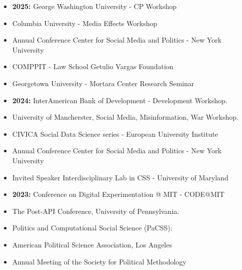 \documentclass[letterpaper, 11pt]{article}
\begin{document}
    \begin{itemize}[leftmargin=0cm, noitemsep]
     \item \textbf{2025:} \hspace{.02cm} George Washington University - CP Workshop
    \item \hspace{1.25cm} Columbia University - Media Effects Workshop
    \item \hspace{1.25cm} Annual Conference Center for Social Media and Politics - New York University
    \item \hspace{1.25cm} COMPPIT - Law School Getulio Vargas Foundation
    \item \hspace{1.25cm} Georgetown University - Mortara Center Research Seminar
    \item \textbf{2024:} \hspace{.02cm} InterAmerican Bank of Development - Development Workshop.
    \item \hspace{1.25cm} University of Mancherster, Social Media, Misinformation, War Workshop.
    \item \hspace{1.25cm} CIVICA Social Data Science series - European University Institute
     \item \hspace{1.25cm} Annual Conference Center for Social Media and Politics - New York University
      \item \hspace{1.25cm} Invited Speaker Interdisciplinary Lab in CSS - University of Maryland
    \item \textbf{2023:} \hspace{.02cm} Conference on Digital Experimentation @ MIT - CODE@MIT
    \item \hspace{1.25cm} The Post-API Conference, University of Pennsylvania.
    \item \hspace{1.25cm} Politics and Computational Social Science (PaCSS):
    \item \hspace{1.25cm} American Political Science Association, Los Angeles
    \item \hspace{1.25cm} Annual Meeting of the Society for Political Methodology

\end{itemize}
\end{document}
